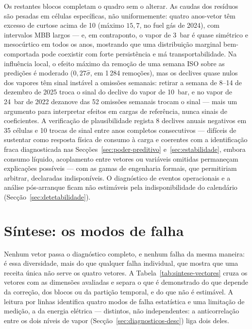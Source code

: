 Os restantes blocos completam o quadro sem o alterar. As caudas dos resíduos
são pesadas em células específicas, não uniformemente: quatro anos-vetor têm
excesso de curtose acima de 10 (máximo $15{,}7$, no fuel gás de 2024), com
intervalos MBB largos --- e, em contraponto, o vapor de 3~bar é quase
simétrico e mesocúrtico em todos os anos, mostrando que uma distribuição
marginal bem-comportada pode coexistir com forte persistência e má
transportabilidade. Na influência local, o efeito máximo da remoção de uma
semana ISO sobre as predições é moderado ($0{,}27\hat\sigma$, em 1\,284
remoções), mas os declives quase nulos dos vapores têm sinal instável a
omissões semanais: retirar a semana de 8--14 de dezembro de 2025 troca o
sinal do declive do vapor de 10~bar, e no vapor de 24~bar de 2022 dezanove
das 52 omissões semanais trocam o sinal --- mais um argumento para
interpretar efeitos em cargas de referência, nunca sinais de coeficientes. A
verificação de plausibilidade regista 8 declives anuais negativos em 35
células e 10 trocas de sinal entre anos completos consecutivos ---
difíceis de sustentar como resposta física de consumo à carga e coerentes com
a identificação fraca diagnosticada nas Secções~\ref{sec:poder-preditivo} e~\ref{sec:estabilidade}, embora consumo líquido,
acoplamento entre vetores ou variáveis omitidas permaneçam explicações
possíveis --- com as gamas de engenharia formais, que permitiriam arbitrar,
declaradas indisponíveis. O diagnóstico de eventos operacionais e a
análise pós-arranque ficam não estimáveis pela indisponibilidade do
calendário (Secção~\ref{sec:detetabilidade}).


\section{Síntese: os modos de falha}
\label{sec:sintese-modos-falha}


Nenhum vetor passa o diagnóstico completo, e nenhum falha da mesma
maneira: é essa diversidade, mais do que qualquer falha individual, que
mostra que uma receita única não serve os quatro vetores. A
Tabela~\ref{tab:sintese-vectores} cruza os vetores com as dimensões
avaliadas e separa o que é demonstrado do que depende da correção, dos
blocos ou da partição temporal, e do que não é estimável. A leitura por
linhas identifica quatro modos de falha estatística e uma limitação de
medição, a da energia elétrica --- distintos, não independentes: a
anticorrelação entre os dois níveis de vapor
(Secção~\ref{sec:diagnosticos-desc}) liga dois deles.

